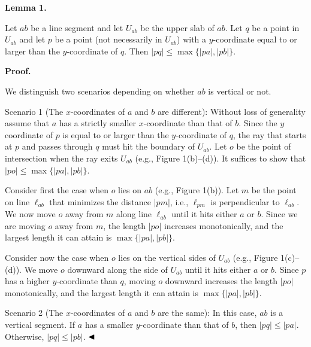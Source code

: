 \par
\par
\par\medskip\noindent\textbf{Lemma 1.}\par
Let $ab$ be a line segment and let $U_{ab}$ be the upper slab of $ab$. Let $q$ be a point in $U_{ab}$ and let $p$ be a point (not necessarily in $U_{ab}$) with a $y$-coordinate equal to or larger than the $y$-coordinate of $q$. Then $|pq|\leq\max\{|pa|,|pb|\}$.
\par
\par
\par
\par\medskip\noindent\textbf{Proof.}\par
We distinguish two scenarios depending on whether $ab$ is vertical or not.
\par
\par
Scenario 1 (The $x$-coordinates of $a$ and $b$ are different): Without loss of generality assume that $a$ has a strictly smaller $x$-coordinate than that of $b$. Since the $y$ coordinate of $p$ is equal to or larger than the $y$-coordinate of $q$, the ray that starts at $p$ and passes through $q$ must hit the boundary of $U_{ab}$. Let $o$ be the point of intersection when the ray exits $U_{ab}$ (e.g., Figure 1(b)–(d)). It suffices to show that $|po|\leq\max\{|pa|,|pb|\}$.
\par
\par
Consider first the case when $o$ lies on $ab$ (e.g., Figure 1(b)). Let $m$ be the point on line $\ell_{ab}$ that minimizes the distance $|pm|$, i.e., $\ell_{pm}$ is perpendicular to $\ell_{ab}$. We now move $o$ away from $m$ along line $\ell_{ab}$ until it hits either $a$ or $b$. Since we are moving $o$ away from $m$, the length $|po|$ increases monotonically, and the largest length it can attain is $\max\{|pa|,|pb|\}$.
\par
\par
Consider now the case when $o$ lies on the vertical sides of $U_{ab}$ (e.g., Figure 1(c)–(d)). We move $o$ downward along the side of $U_{ab}$ until it hits either $a$ or $b$. Since $p$ has a higher $y$-coordinate than $q$, moving $o$ downward increases the length $|po|$ monotonically, and the largest length it can attain is $\max\{|pa|,|pb|\}$.
\par
\par
Scenario 2 (The $x$-coordinates of $a$ and $b$ are the same): In this case, $ab$ is a vertical segment. If $a$ has a smaller $y$-coordinate than that of $b$, then $|pq|\leq|pa|$. Otherwise, $|pq|\leq|pb|$. $\hfill\blacktriangleleft$
